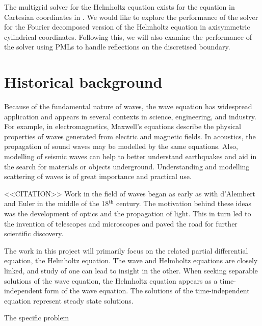 The multigrid solver for the Helmholtz equation exists for the equation in Cartesian coordinates in \oomph.
We would like to explore the performance of the solver for the Fourier decomposed version of the Helmholtz equation in axisymmetric cylindrical coordinates.
Following this, we will also examine the performance of the solver using PMLs to handle reflections on the discretised boundary.




\section{Historical background}

\iffalse
Motivation.
Who cares? Why is it difficult?
What are the benefits?
Need some citations? Names in the field...
\fi



Because of the fundamental nature of waves, the wave equation has widespread application and appears in several contexts in science, engineering, and industry.
For example, in electromagnetics, Maxwell's equations describe the physical properties of waves generated from electric and magnetic fields.
In acoustics, the propagation of sound waves may be modelled by the same equations.
Also, modelling of seismic waves can help to better understand earthquakes and aid in the search for materials or objects underground.
Understanding and modelling scattering of waves is of great importance and practical use.

<<CITATION>>
Work in the field of waves began as early as with d'Alembert and Euler in the middle of the 18$^\text{th}$ century.
The motivation behind these ideas was the development of optics and the propagation of light.
This in turn led to the invention of telescopes and microscopes and paved the road for further scientific discovery.

The work in this project will primarily focus on the related partial differential equation, the Helmholtz equation.
The wave and Helmholtz equations are closely linked, and study of one can lead to insight in the other.
When seeking separable solutions of the wave equation, the Helmholtz equation appears as a time-independent form of the wave equation.
The solutions of the time-independent equation represent steady state solutions.

The specific problem 



